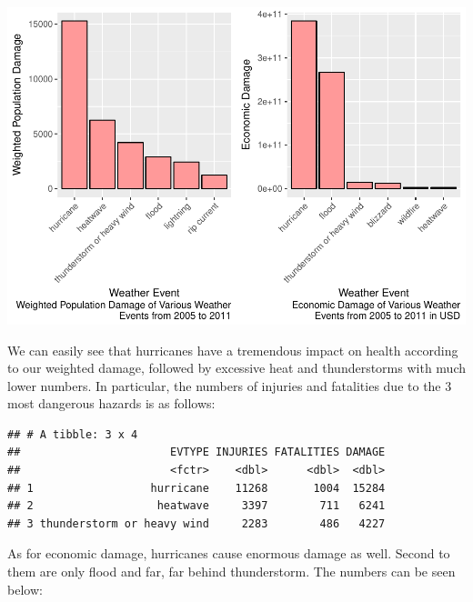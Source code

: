 \documentclass[]{article}
\newenvironment{Shaded}{\begin{snugshade}}{\end{snugshade}}
\newcommand{\KeywordTok}[1]{\textcolor[rgb]{0.13,0.29,0.53}{\textbf{{#1}}}}
\newcommand{\StringTok}[1]{\textcolor[rgb]{0.31,0.60,0.02}{{#1}}}
\newcommand{\NormalTok}[1]{{#1}}
\begin{document}
\includegraphics{StormData_files/figure-latex/damage_plots-1.pdf}

We can easily see that hurricanes have a tremendous impact on health
according to our weighted damage, followed by excessive heat and
thunderstorms with much lower numbers. In particular, the numbers of
injuries and fatalities due to the 3 most dangerous hazards is as
follows:

\begin{Shaded}
\end{Shaded}

\begin{verbatim}
## # A tibble: 3 x 4
##                       EVTYPE INJURIES FATALITIES DAMAGE
##                       <fctr>    <dbl>      <dbl>  <dbl>
## 1                  hurricane    11268       1004  15284
## 2                   heatwave     3397        711   6241
## 3 thunderstorm or heavy wind     2283        486   4227
\end{verbatim}

As for economic damage, hurricanes cause enormous damage as well. Second
to them are only flood and far, far behind thunderstorm. The numbers can
be seen below:

\begin{Shaded}
\end{Shaded}
\end{document}
